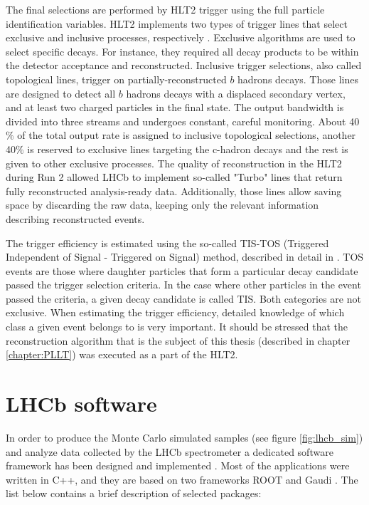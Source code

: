 The final selections are performed by HLT2 trigger using the full particle identification variables. HLT2 implements two types of trigger lines that select exclusive and inclusive processes, respectively . Exclusive algorithms are used to select specific decays. For instance, they required all decay products to be within the detector acceptance and reconstructed. 
Inclusive trigger selections, also called topological lines, trigger on partially-reconstructed $b$ hadrons decays. Those lines are designed to detect all $b$ hadrons decays with a displaced secondary vertex, and at least two charged particles in the final state. The output bandwidth is divided into three streams and undergoes constant, careful monitoring. About 40$\%$ of the total output rate is assigned to inclusive topological selections, another 40$\%$ is reserved to exclusive lines targeting the c-hadron decays and the rest is given to other exclusive processes.
The quality of reconstruction in the HLT2 during Run 2 allowed LHCb to implement so-called "Turbo" lines that return fully reconstructed analysis-ready data. Additionally, those lines allow saving space by discarding the raw data, keeping only the relevant information describing reconstructed events. 

The trigger efficiency is estimated using the so-called TIS-TOS (Triggered Independent of Signal - Triggered on Signal) method, described in detail in \cite{trigger_eff}. TOS events are those where daughter particles that form a particular decay candidate passed the trigger selection criteria. In the case where other particles in the event passed the criteria, a given decay candidate is called TIS.
Both categories are not exclusive. When estimating the trigger efficiency, detailed knowledge of which class a given event belongs to is very important.
It should be stressed that the reconstruction algorithm that is the subject of this thesis (described in chapter \ref{chapter:PLLT}) was executed as a part of the HLT2. 

\section{LHCb software}

In order to produce the Monte Carlo simulated samples (see figure \ref{fig:lhcb_sim}) and analyze data collected by the LHCb spectrometer a dedicated software framework has been designed and implemented \cite{lhcb_software}. Most of the applications were written in  C++, and they are based on two frameworks ROOT \cite{root} and Gaudi \cite{gaudi}. The list below contains a brief description of selected packages:

